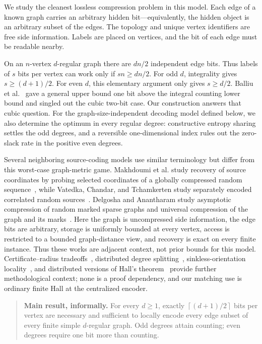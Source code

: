 \documentclass[11pt]{article}
\theoremstyle{definition}
\theoremstyle{remark}
\newcommand{\ceil}[1]{\left\lceil #1\right\rceil}
\begin{document}
We study the cleanest lossless compression problem in this model.  Each edge
of a known graph carries an arbitrary hidden bit---equivalently, the hidden
object is an arbitrary subset of the edges.  The topology and unique vertex
identifiers are free side information.  Labels are placed on vertices, and
the bit of each edge must be readable nearby.

On an $n$-vertex $d$-regular graph there are $dn/2$ independent edge bits.
Thus labels of $s$ bits per vertex can work only if $sn\ge dn/2$.  For odd
$d$, integrality gives $s\ge(d+1)/2$.  For even $d$, this elementary argument
only gives $s\ge d/2$.  Balliu et al.~\cite{BalliuEtAl2025LocalAdvice} gave a
general upper bound one bit above the integral counting lower bound and singled
out the cubic two-bit case.  Our construction answers that cubic question.
For the graph-size-independent decoding model defined below, we also determine
the optimum in every regular degree: constructive entropy sharing settles
the odd degrees, and a reversible one-dimensional index rules out the
zero-slack rate in the positive even degrees.

Several neighboring source-coding models use similar terminology but differ
from this worst-case graph-metric game.  Makhdoumi et al. study recovery of
source coordinates by probing selected coordinates of a globally compressed
random sequence~\cite{MakhdoumiEtAl2015LDSC}, while Vatedka, Chandar, and
Tchamkerten study separately encoded correlated random
sources~\cite{VatedkaEtAl2022LocalDecoding}.  Delgosha and Anantharam study
asymptotic compression of random marked sparse graphs and universal
compression of the graph and its marks~\cite{DelgoshaAnantharam2022DistributedGraphical,
DelgoshaAnantharam2020UniversalGraphical}.  Here the graph is uncompressed
side information, the edge bits are arbitrary, storage is uniformly bounded
at every vertex, access is restricted to a bounded graph-distance view, and
recovery is exact on every finite instance.  Thus these works are adjacent
context, not prior bounds for this model.  Certificate--radius
tradeoffs~\cite{FeuilloleyEtAl2021Redundancy}, distributed degree
splitting~\cite{GhaffariEtAl2020DegreeSplitting}, sinkless-orientation
locality~\cite{BalliuEtAl2023Sinkless}, and distributed versions of Hall's
theorem~\cite{BrandtEtAl2025Hall} provide further methodological context;
none is a proof dependency, and our matching use is ordinary finite Hall at
the centralized encoder.

\begin{quote}
\textbf{Main result, informally.}
For every $d\ge1$, exactly $\ceil{(d+1)/2}$ bits per vertex are necessary and
sufficient to locally encode every edge subset of every finite simple
$d$-regular graph.  Odd degrees attain counting; even degrees require one
bit more than counting.
\end{quote}
\end{document}
